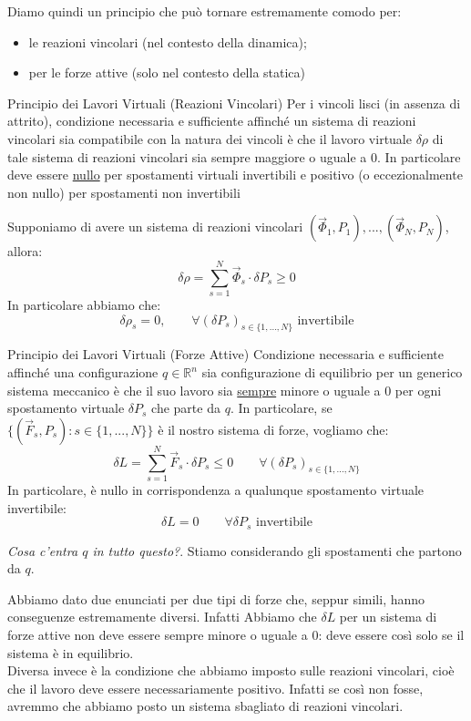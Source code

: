 \documentclass[11pt,a4paper,twoside]{article}
\theoremstyle{definition}
\begin{document}
Diamo quindi un principio che può tornare estremamente comodo per:
\begin{itemize}
	\item le reazioni vincolari (nel contesto della dinamica);
	\item per le forze attive (solo nel contesto della statica)
\end{itemize}

\begin{thm}{Principio dei Lavori Virtuali (Reazioni Vincolari)}{}\label{drho}
	Per i vincoli lisci (in assenza di attrito), condizione necessaria e sufficiente affinché un sistema di reazioni vincolari sia compatibile con la natura dei vincoli è che il lavoro virtuale $\delta \rho$ di tale sistema di reazioni vincolari sia sempre maggiore o uguale a $0$. In particolare deve essere \underline{nullo} per spostamenti virtuali invertibili e positivo (o eccezionalmente non nullo) per spostamenti non invertibili
\end{thm}

Supponiamo di avere un sistema di reazioni vincolari $(\vec \Phi_1, P_1),...,(\vec \Phi_N, P_N)$, allora:
\[ \delta \rho = \sum_{s = 1}^N \vec \Phi_s \cdot \delta P_s \geq 0 \]
In particolare abbiamo che:
\[ \delta \rho_s = 0, \qquad\forall (\delta P_s)_{s \in \{1,...,N\}} \text{ invertibile}\]

\begin{thm}{Principio dei Lavori Virtuali (Forze Attive)}{}\label{PLVA}
	Condizione necessaria e sufficiente affinché una configurazione $q \in \mathbb R^n$ sia configurazione di equilibrio per un generico sistema meccanico è che il suo lavoro sia \underline{sempre} minore o uguale a $0$ per ogni spostamento virtuale $\delta P_s$ che parte da $q$.
	In particolare, se $\{(\vec F_s, P_s):s \in \{1,...,N\}\}$ è il nostro sistema di forze, vogliamo che:
	\[ \delta L = \sum_{s = 1}^N \vec F_s \cdot \delta P_s \leq 0\qquad \forall (\delta P_s)_{s \in \{1,...,N\}} \]
	In particolare, è nullo in corrispondenza a qualunque spostamento virtuale invertibile:
	\[ \delta L= 0\qquad \forall \delta P_s\text{ invertibile} \]
\end{thm}

\textit{Cosa c'entra $q$ in tutto questo?}. Stiamo considerando gli spostamenti che partono da $q$.

Abbiamo dato due enunciati per due tipi di forze che, seppur simili, hanno conseguenze estremamente diversi. Infatti Abbiamo che $\delta L$ per un sistema di forze attive non deve essere sempre minore o uguale a $0$: deve essere così solo se il sistema è in equilibrio.\\
Diversa invece è la condizione che abbiamo imposto sulle reazioni vincolari, cioè che il lavoro deve essere necessariamente positivo. Infatti se così non fosse, avremmo che abbiamo posto un sistema sbagliato di reazioni vincolari.
\end{document}
